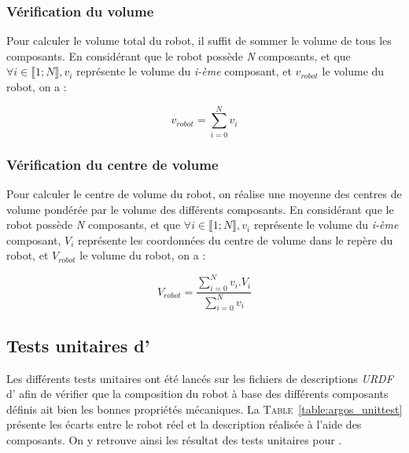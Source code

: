 			\subsubsection{Vérification du volume}

				Pour calculer le volume total du robot, il suffit de sommer le volume de tous les composants. En considérant que le robot possède \textit{N} composants, et que $\forall i \in \llbracket 1; N \rrbracket, v_i$ représente le volume du \textit{i-ème} composant, et $v_{robot}$ le volume du robot, on a :

				\begin{equation}
					v_{robot} = \sum_{i=0}^{N}v_i
				\end{equation}

			\subsubsection{Vérification du centre de volume}

				Pour calculer le centre de volume du robot, on réalise une moyenne des centres de volume pondérée par le volume des différents composants. En considérant que le robot possède \textit{N} composants, et que $\forall i \in \llbracket 1; N \rrbracket, v_i$ représente le volume du \textit{i-ème} composant, $V_i$ représente les coordonnées du centre de volume dans le repère du robot, et $V_{robot}$ le volume du robot, on a :

				\begin{equation}
					V_{robot} = \frac{\sum_{i=0}^{N}v_i.V_i}{\sum_{i=0}^{N}v_i}
				\end{equation}


		\subsection{Tests unitaires d'\argos{}}

			Les différents tests unitaires ont été lancés sur les fichiers de descriptions \textit{URDF} d'\argos{} afin de vérifier que la composition du robot à base des différents composants définis ait bien les bonnes propriétés mécaniques. La \textsc{Table}~\ref{table:argos_unittest} présente les écarts entre le robot réel et la description réalisée à l'aide des composants. On y retrouve ainsi les résultat des tests unitaires pour \argos{}.
			
